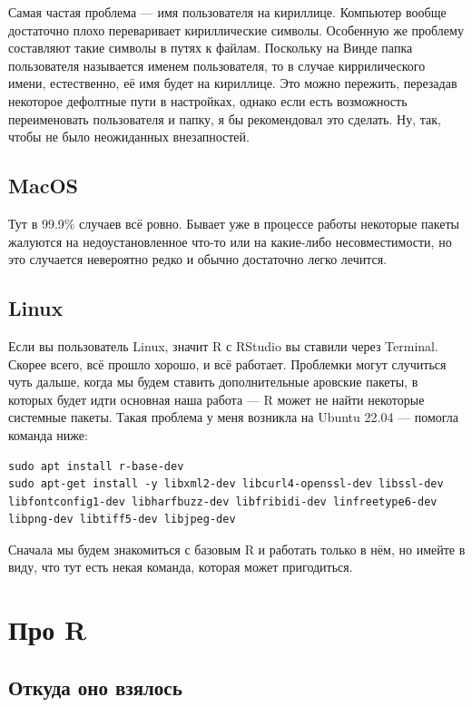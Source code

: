 \documentclass[
  letterpaper,
]{scrbook}
\theoremstyle{definition}
\theoremstyle{remark}
\begin{document}
Самая частая проблема --- имя пользователя на кириллице. Компьютер
вообще достаточно плохо переваривает кириллические символы. Особенную же
проблему составляют такие символы в путях к файлам. Поскольку на Винде
папка пользователя называется именем пользователя, то в случае
киррилического имени, естественно, её имя будет на кириллице. Это можно
пережить, перезадав некоторое дефолтные пути в настройках, однако если
есть возможность переименовать пользователя и папку, я бы рекомендовал
это сделать. Ну, так, чтобы не было неожиданных внезапностей.

\subsection{MacOS}\label{rbasics-installation-problems-mac}

Тут в 99.9\% случаев всё ровно. Бывает уже в процессе работы некоторые
пакеты жалуются на недоустановленное что-то или на какие-либо
несовместимости, но это случается невероятно редко и обычно достаточно
легко лечится.

\subsection{Linux}\label{rbasics-installation-problems-linux}

Если вы пользователь Linux, значит R с RStudio вы ставили через
Terminal. Скорее всего, всё прошло хорошо, и всё работает. Проблемки
могут случиться чуть дальше, когда мы будем ставить дополнительные
аровские пакеты, в которых будет идти основная наша работа --- R может
не найти некоторые системные пакеты. Такая проблема у меня возникла на
Ubuntu 22.04 --- помогла команда ниже:

\begin{verbatim}
sudo apt install r-base-dev
sudo apt-get install -y libxml2-dev libcurl4-openssl-dev libssl-dev libfontconfig1-dev libharfbuzz-dev libfribidi-dev linfreetype6-dev libpng-dev libtiff5-dev libjpeg-dev
\end{verbatim}

Сначала мы будем знакомиться с базовым R и работать только в нём, но
имейте в виду, что тут есть некая команда, которая может пригодиться.

\section{Про R}\label{rbasics-r-about}

\subsection{Откуда оно взялось}\label{rbasics-where-r-from}
\end{document}
